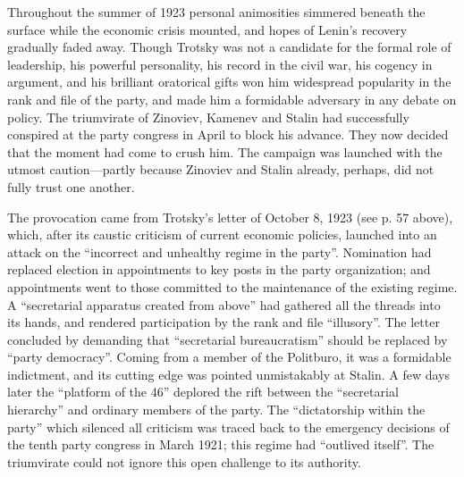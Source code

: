 Throughout the summer of 1923 personal animosities simmered beneath the surface while the economic crisis mounted, and hopes of Lenin's recovery gradually faded away. Though Trotsky was not a candidate for the formal role of leadership, his powerful personality, his record in the civil war, his cogency in argument, and his brilliant oratorical gifts won him widespread popularity in the rank and file of the party, and made him a formidable adversary in any debate on policy. The triumvirate of Zinoviev, Kamenev and Stalin had successfully conspired at the party congress in April to block his advance. They now decided that the moment had come to crush him. The campaign was launched with the utmost caution---partly because Zinoviev and Stalin already, perhaps, did not fully trust one another. 

The provocation came from Trotsky's letter of October 8, 1923 (see p. 57 above), which, after its caustic criticism of current economic policies, launched into an attack on the ``incorrect and unhealthy regime in the party''. Nomination had replaced election in appointments to key posts in the party organization; and appointments went to those committed to the maintenance of the existing regime. A ``secretarial apparatus created from above'' had gathered all the threads into its hands, and rendered participation by the rank and file ``illusory''. The letter concluded by demanding that ``secretarial bureaucratism'' should be replaced by ``party democracy''. Coming from a member of the Politburo, it was a formidable indictment, and its cutting edge was pointed unmistakably at Stalin. A few days later the ``platform of the 46'' deplored the rift between the ``secretarial hierarchy'' and ordinary members of the party. The ``dictatorship within the party'' which silenced all criticism was traced back to the emergency decisions of the tenth party congress in March 1921; this regime had ``outlived itself''. The triumvirate could not ignore this open challenge to its authority. 


